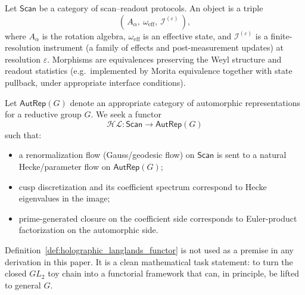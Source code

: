 \begin{definition}
\label{def:holographic_langlands_functor}
Let $\mathsf{Scan}$ be a category of scan--readout protocols. An object is a triple
\begin{equation}
(\,A_\alpha,\ \omega_{\mathrm{eff}},\ \mathcal I^{(\varepsilon)}\,),
\end{equation}
where $A_\alpha$ is the rotation algebra, $\omega_{\mathrm{eff}}$ is an effective state, and $\mathcal I^{(\varepsilon)}$ is a finite-resolution instrument (a family of effects and post-measurement updates) at resolution $\varepsilon$. Morphisms are equivalences preserving the Weyl structure and readout statistics (e.g.\ implemented by Morita equivalence together with state pullback, under appropriate interface conditions).

Let $\mathsf{AutRep}(G)$ denote an appropriate category of automorphic representations for a reductive group $G$.
We seek a functor
\begin{equation}
\mathcal{HL}:\mathsf{Scan}\to \mathsf{AutRep}(G)
\end{equation}
such that:
\begin{itemize}
\item a renormalization flow (Gauss/geodesic flow) on $\mathsf{Scan}$ is sent to a natural Hecke/parameter flow on $\mathsf{AutRep}(G)$;
\item cusp discretization and its coefficient spectrum correspond to Hecke eigenvalues in the image;
\item prime-generated closure on the coefficient side corresponds to Euler-product factorization on the automorphic side.
\end{itemize}
\end{definition}

\begin{remark}
Definition~\ref{def:holographic_langlands_functor} is not used as a premise in any derivation in this paper. It is a clean mathematical task statement: to turn the closed $GL_2$ toy chain into a functorial framework that can, in principle, be lifted to general $G$.
\end{remark}


